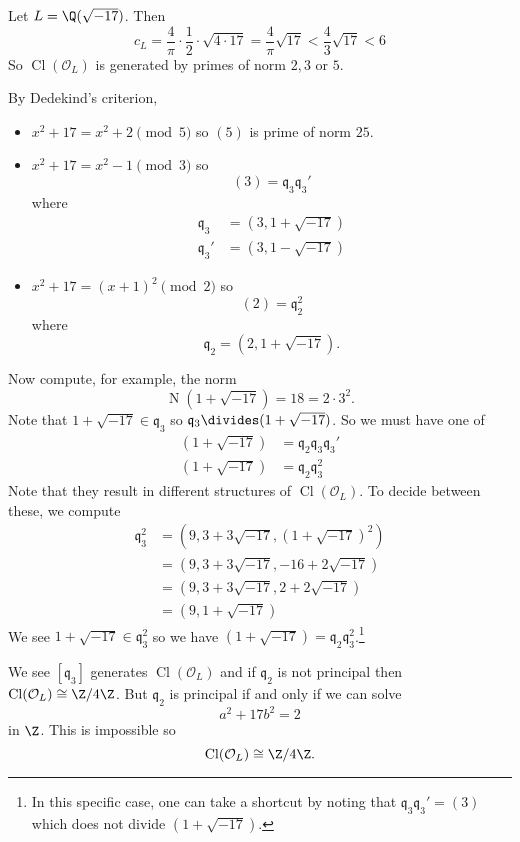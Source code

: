 \documentclass[a4paper]{article}
\renewcommand*{\O}{\mathcal{O}}
\DeclareMathOperator{\n}{N}
\DeclareMathOperator{\Cl}{Cl} %
\begin{document}
\begin{eg}
  Let \(L = \Q(\sqrt{-17})\). Then
  \[
    c_L = \frac{4}{\pi} \cdot \frac{1}{2} \cdot \sqrt{4 \cdot 17} = \frac{4}{\pi} \sqrt{17} < \frac{4}{3} \sqrt{17} < 6
  \]
  So \(\Cl(\O_L)\) is generated by primes of norm \(2, 3\) or \(5\).

  By Dedekind's criterion,
  \begin{itemize}
  \item \(x^2 + 17 = x^2 + 2 \pmod 5\) so \((5)\) is prime of norm \(25\).
  \item \(x^2 + 17 = x^2 - 1 \pmod 3\) so
    \[
      (3) = \mathfrak q_3 \mathfrak q_3'
    \]
    where
    \begin{align*}
      \mathfrak q_3 &= (3, 1 + \sqrt{-17}) \\
      \mathfrak q_3' &= (3, 1 - \sqrt{-17})
    \end{align*}
  \item \(x^2 + 17 = (x + 1)^2 \pmod 2\) so
    \[
      (2) = \mathfrak q_2^2
    \]
    where
    \[
      \mathfrak q_2 = (2, 1 + \sqrt{-17}).
    \]
  \end{itemize}
  Now compute, for example, the norm
  \[
    \n(1 + \sqrt{-17}) = 18 = 2 \cdot 3^2.
  \]
  Note that \(1 + \sqrt{-17} \in \mathfrak q_3\) so \(\mathfrak q_3 \divides (1 + \sqrt{-17})\). So we must have one of
  \begin{align*}
    (1 + \sqrt{-17}) &= \mathfrak q_2 \mathfrak q_3 \mathfrak q_3' \\
    (1 + \sqrt{-17}) &= \mathfrak q_2 \mathfrak q_3^2
  \end{align*}
  Note that they result in different structures of \(\Cl(\O_L)\). To decide between these, we compute
  \begin{align*}
    \mathfrak q_3^2
    &= (9, 3 + 3 \sqrt{-17}, (1 + \sqrt{-17})^2) \\
    &= (9, 3 + 3 \sqrt{-17}, -16 + 2 \sqrt{-17}) \\
    &= (9, 3 + 3 \sqrt{-17}, 2 + 2 \sqrt{-17}) \\
    &= (9, 1 + \sqrt{-17})
  \end{align*}
  We see \(1 + \sqrt{-17} \in \mathfrak q_3^2\) so we have \((1 + \sqrt{-17}) = \mathfrak q_2 \mathfrak q_3^2\).\footnote{In this specific case, one can take a shortcut by noting that \(\mathfrak q_3 \mathfrak q_3' = (3)\) which does not divide \((1 + \sqrt{-17})\).}

  We see \([\mathfrak q_3]\) generates \(\Cl(\O_L)\) and if \(\mathfrak q_2\) is not principal then \(\Cl(\O_L) \cong \Z/4\Z\). But \(\mathfrak q_2\) is principal if and only if we can solve
  \[
    a^2 + 17b^2 = 2
  \]
  in \(\Z\). This is impossible so
  \[
    \Cl(\O_L) \cong \Z/4\Z.
  \]
\end{eg}
\end{document}
